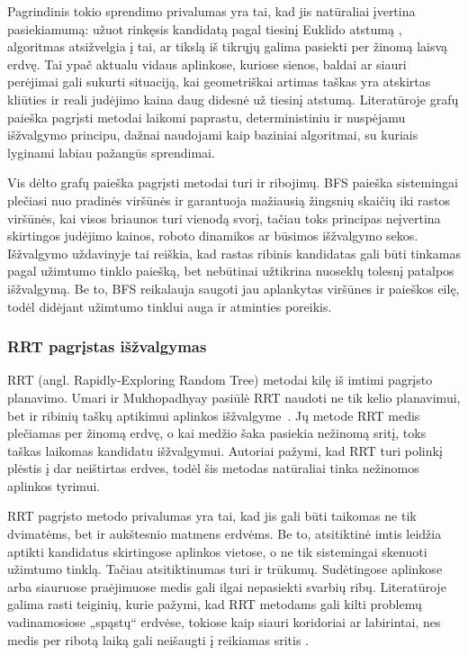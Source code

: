 \documentclass[]{VUMIFTemplateClass}
\begin{document}
Pagrindinis tokio sprendimo privalumas yra tai, kad jis natūraliai įvertina pasiekiamumą: užuot rinkęsis kandidatą pagal tiesinį Euklido atstumą \cite{Euclidean-Distance}, algoritmas   
atsižvelgia į tai, ar tikslą iš tikrųjų galima pasiekti per žinomą laisvą erdvę. Tai ypač aktualu vidaus aplinkose, kuriose sienos, baldai ar siauri perėjimai
gali sukurti situaciją, kai geometriškai artimas taškas yra atskirtas kliūties ir reali judėjimo kaina daug didesnė už tiesinį atstumą. Literatūroje grafų     
paieška pagrįsti metodai laikomi paprastu, deterministiniu ir nuspėjamu išžvalgymo principu, dažnai naudojami kaip baziniai algoritmai, su kuriais lyginami    
labiau pažangūs sprendimai.                                                                                                        
                                                                                                                                                                
Vis dėlto grafų paieška pagrįsti metodai turi ir ribojimų. BFS paieška sistemingai plečiasi
nuo pradinės viršūnės ir garantuoja mažiausią žingsnių skaičių iki rastos viršūnės, kai visos
briaunos turi vienodą svorį, tačiau toks principas neįvertina skirtingos judėjimo kainos, roboto
dinamikos ar būsimos išžvalgymo sekos. Išžvalgymo uždavinyje tai reiškia, kad rastas ribinis
kandidatas gali būti tinkamas pagal užimtumo tinklo paiešką, bet nebūtinai užtikrina nuoseklų
tolesnį patalpos išžvalgymą. Be to, BFS reikalauja saugoti jau aplankytas viršūnes ir paieškos eilę,
todėl didėjant užimtumo tinklui auga ir atminties poreikis.

\subsubsection{RRT pagrįstas išžvalgymas}

RRT (angl. Rapidly-­Exploring Random Tree) metodai kilę iš imtimi pagrįsto planavimo. Umari ir Mukhopadhyay pasiūlė RRT naudoti ne tik kelio planavimui,
bet ir ribinių taškų aptikimui aplinkos išžvalgyme~\cite{umari2017rrt}. Jų metode RRT medis plečiamas per žinomą erdvę, o kai medžio šaka pasiekia nežinomą
sritį, toks taškas laikomas kandidatu išžvalgymui. Autoriai pažymi, kad RRT turi polinkį plėstis į dar neištirtas erdves, todėl šis metodas natūraliai tinka
nežinomos aplinkos tyrimui.

RRT pagrįsto metodo privalumas yra tai, kad jis gali būti taikomas ne tik dvimatėms, bet ir aukštesnio matmens erdvėms. Be to, atsitiktinė imtis leidžia aptikti
kandidatus skirtingose aplinkos vietose, o ne tik sistemingai skenuoti užimtumo tinklą. Tačiau atsitiktinumas turi ir trūkumų. Sudėtingose aplinkose arba
siauruose praėjimuose medis gali ilgai nepasiekti svarbių ribų. Literatūroje galima rasti teiginių, kurie pažymi, kad RRT metodams gali kilti problemų vadinamosiose „spąstų“ erdvėse, tokiose
kaip siauri koridoriai ar labirintai, nes medis per ribotą laiką gali neišaugti į reikiamas sritis \cite{chen2022gvd}.
\end{document}
